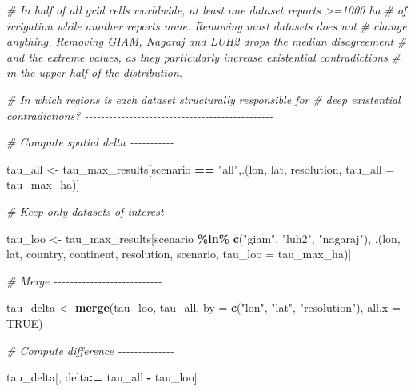 \documentclass[
  11pt,
]{article}
\newenvironment{Shaded}{\begin{snugshade}}{\end{snugshade}}
\newcommand{\AttributeTok}[1]{\textcolor[rgb]{0.13,0.29,0.53}{#1}}
\newcommand{\CommentTok}[1]{\textcolor[rgb]{0.56,0.35,0.01}{\textit{#1}}}
\newcommand{\ConstantTok}[1]{\textcolor[rgb]{0.56,0.35,0.01}{#1}}
\newcommand{\FunctionTok}[1]{\textcolor[rgb]{0.13,0.29,0.53}{\textbf{#1}}}
\newcommand{\NormalTok}[1]{#1}
\newcommand{\OtherTok}[1]{\textcolor[rgb]{0.56,0.35,0.01}{#1}}
\newcommand{\SpecialCharTok}[1]{\textcolor[rgb]{0.81,0.36,0.00}{\textbf{#1}}}
\newcommand{\StringTok}[1]{\textcolor[rgb]{0.31,0.60,0.02}{#1}}
\begin{document}
\begin{Shaded}
\begin{Highlighting}[]
\CommentTok{\# In half of all grid cells worldwide, at least one dataset reports \textgreater{}=1000 ha}
\CommentTok{\# of irrigation while another reports none. Removing most datasets does not}
\CommentTok{\# change anything. Removing GIAM, Nagaraj and LUH2 drops the median disagreement}
\CommentTok{\# and the extreme values, as they particularly increase existential contradictions}
\CommentTok{\# in the upper half of the distribution.}

\CommentTok{\# In which regions is each dataset structurally responsible for}
\CommentTok{\# deep existential contradictions? {-}{-}{-}{-}{-}{-}{-}{-}{-}{-}{-}{-}{-}{-}{-}{-}{-}{-}{-}{-}{-}{-}{-}{-}{-}{-}{-}{-}{-}{-}{-}{-}{-}{-}{-}{-}{-}{-}{-}{-}{-}{-}{-}{-}{-}{-}{-}}

\CommentTok{\# Compute spatial delta {-}{-}{-}{-}{-}{-}{-}{-}{-}{-}{-}}

\NormalTok{tau\_all }\OtherTok{\textless{}{-}}\NormalTok{ tau\_max\_results[scenario }\SpecialCharTok{==} \StringTok{"all"}\NormalTok{,.(lon, lat, resolution,}
                                               \AttributeTok{tau\_all =}\NormalTok{ tau\_max\_ha)]}

\CommentTok{\# Keep only datasets of interest{-}{-}}

\NormalTok{tau\_loo }\OtherTok{\textless{}{-}}\NormalTok{ tau\_max\_results[scenario }\SpecialCharTok{\%in\%} \FunctionTok{c}\NormalTok{(}\StringTok{"giam"}\NormalTok{, }\StringTok{"luh2"}\NormalTok{, }\StringTok{"nagaraj"}\NormalTok{),}
\NormalTok{                           .(lon, lat, country, continent, resolution, scenario,}
                             \AttributeTok{tau\_loo =}\NormalTok{ tau\_max\_ha)]}

\CommentTok{\# Merge {-}{-}{-}{-}{-}{-}{-}{-}{-}{-}{-}{-}{-}{-}{-}{-}{-}{-}{-}{-}{-}{-}{-}{-}{-}{-}{-}}

\NormalTok{tau\_delta }\OtherTok{\textless{}{-}} \FunctionTok{merge}\NormalTok{(tau\_loo, tau\_all, }\AttributeTok{by =} \FunctionTok{c}\NormalTok{(}\StringTok{"lon"}\NormalTok{, }\StringTok{"lat"}\NormalTok{, }\StringTok{"resolution"}\NormalTok{),}
                   \AttributeTok{all.x =} \ConstantTok{TRUE}\NormalTok{)}

\CommentTok{\# Compute difference {-}{-}{-}{-}{-}{-}{-}{-}{-}{-}{-}{-}{-}{-}}

\NormalTok{tau\_delta[, delta}\SpecialCharTok{:=}\NormalTok{ tau\_all }\SpecialCharTok{{-}}\NormalTok{ tau\_loo]}


\end{Highlighting}
\end{Shaded}
\end{document}
